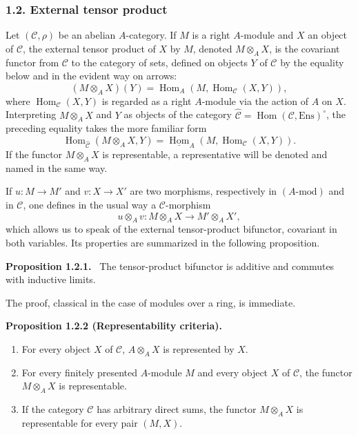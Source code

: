 \documentclass[11pt]{article}
\providecommand{\uHom}{\underline{\Hom}}
\newenvironment{statement}[1]{\par\medskip\noindent\textbf{#1.}\ }{\par\medskip}
\DeclareMathOperator{\Hom}{Hom}
\providecommand{\Hom}{\operatorname{Hom}}
\providecommand{\Ens}{\mathrm{Ens}}
\providecommand{\cC}{\mathcal C}
\providecommand{\Ens}{\operatorname{Ens}}
\providecommand{\cC}{\mathcal C}
\providecommand{\Hom}{\operatorname{Hom}}
\begin{document}
\subsubsection*{1.2. External tensor product}\label{sga5:V:subsubsection:1.2}
Let $(\cC,\rho)$ be an abelian $A$-category. If $M$ is a right $A$-module and $X$ an object of $\cC$, the external tensor product of $X$ by $M$, denoted $M\otimes_A X$, is the covariant functor from $\cC$ to the category of sets, defined on objects $Y$ of $\cC$ by the equality below and in the evident way on arrows:
\[
(M\otimes_A X)(Y)=\Hom_A(M,\Hom_{\cC}(X,Y)),
\]
where $\Hom_{\cC}(X,Y)$ is regarded as a right $A$-module via the action of $A$ on $X$. Interpreting $M\otimes_AX$ and $Y$ as objects of the category $\widehat{\cC}=\Hom(\cC,\Ens)^{\circ}$, the preceding equality takes the more familiar form
\[
\Hom_{\widehat{\cC}}(M\otimes_A X,Y)=\uHom_A(M,\Hom_{\cC}(X,Y)).
\]
If the functor $M\otimes_A X$ is representable, a representative will be denoted and named in the same way.

If $u:M\to M'$ and $v:X\to X'$ are two morphisms, respectively in $(A\text{-mod})$ and in $\cC$, one defines in the usual way a $\cC$-morphism
\[
u\otimes_A v:M\otimes_A X\longrightarrow M'\otimes_A X',
\]
which allows us to speak of the external tensor-product bifunctor, covariant in both variables. Its properties are summarized in the following proposition.

\label{sga5:V:proposition:1.2.1}\begin{statement}{Proposition 1.2.1}
The tensor-product bifunctor is additive and commutes with inductive limits.
\end{statement}
The proof, classical in the case of modules over a ring, is immediate.

\label{sga5:V:proposition:1.2.2}\begin{statement}{Proposition 1.2.2 (Representability criteria)}
\begin{enumerate}[label=(\alph*)]
\item For every object $X$ of $\cC$, $A\otimes_AX$ is represented by $X$.
\item For every finitely presented $A$-module $M$ and every object $X$ of $\cC$, the functor $M\otimes_AX$ is representable.
\item If the category $\cC$ has arbitrary direct sums, the functor $M\otimes_A X$ is representable for every pair $(M,X)$.
\end{enumerate}
\end{statement}
\end{document}
